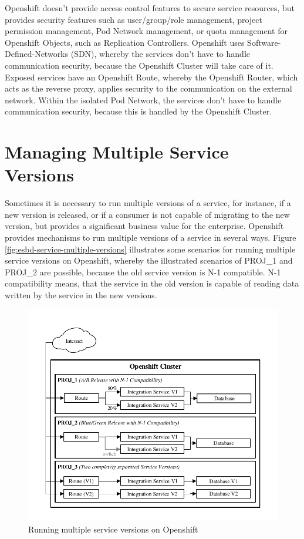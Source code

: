 Openshift doesn't provide access control features to secure service resources, but provides security features such as user/group/role management, project permission management, Pod Network management, or quota management for Openshift Objects, such as Replication Controllers. Openshift uses Software-Defined-Networks (SDN), whereby 
the services don't have to handle communication security, because the Openshift Cluster will take care of it. Exposed services have an Openshift Route, whereby the Openshift Router, which acts as the reverse proxy, applies security to the communication on the external network. Within the isolated Pod Network, the services don't have to handle communication security, because this is handled by the Openshift Cluster. 

\section{Managing Multiple Service Versions}
\label{sec:esbd-multi-version-service}
Sometimes it is necessary to run multiple versions of a service, for instance, if a new version is released, or if a consumer is not capable of migrating to the new version, but provides a significant business value for the enterprise. Openshift provides mechanisms to run multiple versions of a service in several ways. Figure \vref{fig:esbd-service-multiple-versions} illustrates some scenarios for running multiple service versions on Openshift, whereby the illustrated scenarios of PROJ\_1 and PROJ\_2 are possible, because the old service version is N-1 compatible. N-1 compatibility means, that the service in the old version is capable of reading data written by the service in the new versions.
\newpage

\begin{figure}[htbp]
	\centering
	\includegraphics[scale=1]{images/esbd-service-multiple-versions.pdf}
	\caption{Running multiple service versions on Openshift}
	\label{fig:esbd-service-multiple-versions}
\end{figure}

